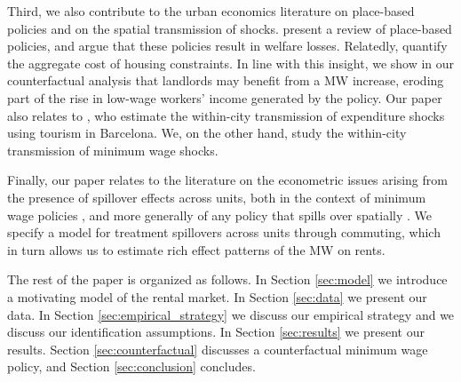 Third, we also contribute to the urban economics literature on place-based 
policies and on the spatial transmission of shocks.
\textcite{KlineMoretti2014} present a review of place-based policies, and 
argue that these policies result in welfare losses.
Relatedly, \textcite{HsiehMoretti2019} quantify the aggregate cost of housing 
constraints.
In line with this insight, we show in our counterfactual analysis that landlords
may benefit from a MW increase, eroding part of the rise in low-wage workers' 
income generated by the policy.
Our paper also relates to \textcite{AllenEtAl2020}, who estimate the 
within-city transmission of expenditure shocks using tourism in Barcelona.
We, on the other hand, study the within-city transmission of minimum wage shocks.

Finally, our paper relates to the literature on the econometric issues arising 
from the presence of spillover effects across units,
both in the context of minimum wage policies \parencite{Kuehn2016, Huang2020}, 
and more generally of any policy that spills over spatially
\parencite{DelgadoFlorax2015, Butts2021}.
We specify a model for treatment spillovers across units through commuting, 
which in turn allows us to estimate rich effect patterns of the MW on rents.

The rest of the paper is organized as follows.
In Section \ref{sec:model} we introduce a motivating model of the rental market.
In Section \ref{sec:data} we present our data.
In Section \ref{sec:empirical_strategy} we discuss our empirical strategy and
we discuss our identification assumptions.
In Section \ref{sec:results} we present our results.
Section \ref{sec:counterfactual} discusses a counterfactual minimum wage policy, and
Section \ref{sec:conclusion} concludes.
